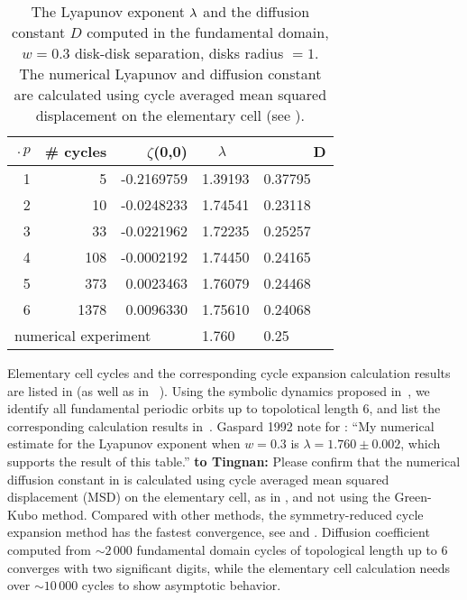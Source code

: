 \begin{table}[htbp]
	\centering
	\begin{tabular}{|r|r|r|l|l|}
		\hline
		$\period{p}$ &
                 \# cycles
                        & $\zeta$(0,0) & $~~~~~\lambda$
                                               & ~~~~~~D \\
		\hline\hline
		1      & 5      & -0.2169759 & 1.39193 & 0.37795 \\
		2      & 10     & -0.0248233 & 1.74541 & 0.23118 \\
		3      & 33     & -0.0221962 & 1.72235 & 0.25257 \\
		4      & 108    & -0.0002192 & 1.74450 & 0.24165 \\
		5      & 373    &  0.0023463 & 1.76079 & 0.24468 \\
		6      & 1378   &  0.0096330 & 1.75610 & 0.24068 \\
		\hline\hline
		\multicolumn{3}{|l|}{numerical experiment}
		& 1.760   & 0.25
		\\ \hline
	\end{tabular}
	\caption[Fundamental domain cycle expansion results of diffusion
	coefficient]{\label{TCELL2}
The Lyapunov exponent $\lambda$ and the diffusion constant $D$ computed in
the fundamental domain, $w=0.3$ disk-disk separation, disks radius $=1$.
The numerical Lyapunov and diffusion constant are calculated using cycle
averaged mean squared displacement  on the
elementary cell (see ).
	}
\end{table}

Elementary cell cycles and the corresponding cycle expansion
calculation results are listed in  (as well as in
~\cite{CGS92}). Using the symbolic
dynamics proposed in~, we
identify all fundamental periodic orbits up to topolotical length 6,
and list the corresponding calculation results 
in~.
     {
    Gaspard 1992 note for : ``My numerical estimate for
    the Lyapunov exponent when $w=0.3$ is 		$\lambda = 1.760 \pm
    0.002$, which supports the result of this table.''
        }
     { {\bf to Tingnan:}
    Please confirm that the numerical diffusion constant in
     is calculated using cycle averaged mean squared
    displacement (MSD)  on the elementary cell, as in
    , and not using the Green-Kubo method.
        }
Compared with other methods, the symmetry-reduced cycle expansion method
has the fastest convergence, see  and
. Diffusion coefficient computed from
$\sim2\,000$ fundamental domain cycles of topological length up to 6
converges with two significant digits, while the elementary cell
calculation needs over $\sim 10\,000$ cycles to show asymptotic behavior.

